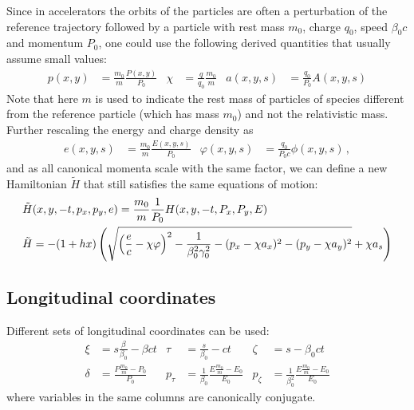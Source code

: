 Since in accelerators the orbits of the 
particles are often a perturbation of the reference trajectory followed by a
particle with rest mass $m_0$, charge $q_0$, speed $\beta_0 c$ and momentum
$P_0$, one could use the following derived quantities that usually assume small
values:
\begin{align}
p(x,y) &=
  \frac{m_0}{m}\frac{P(x,y)}{P_0}   &
\chi &=
  \frac{q}{q_0}\frac{m_0}{m} &
a(x,y,s) &=
  \frac{q_0}{P_0}  A(x,y,s)
\end{align}
Note that here $m$ is used to indicate the rest mass of particles of species
different from the reference particle (which has mass $m_0$) and not the relativistic mass.
Further rescaling the energy and charge density as
\begin{align}
  e(x,y,s) &=
  \frac{m_0}{m}\frac{E(x,y,s)}{P_0}   &
  \varphi(x,y,s) &=
  \frac{q_0}{P_0c}\phi(x,y,s) \,,
\end{align}
and as all canonical momenta scale with the same factor, we can define a new Hamiltonian
$\tilde{H}$ that still satisfies the same equations of motion:
\begin{align}\notag
  &\tilde{H}(x,y,-t, p_x, p_y, e) =
      \frac{m_0}{m}\frac{1}{P_0}H(x,y,-t, P_x, P_y, E) \\
  &\tilde{H}=
    - (1+h x) \left(
      \sqrt{ 
          \left(\frac{e}{c} - \chi\varphi\right)^2
            - \frac{1}{\beta_0^2\gamma_0^2}
           - (p_x - \chi a_x)^2
           - (p_y - \chi a_y)^2}
       + \chi a_s
    \right)
\end{align}

\subsection{Longitudinal coordinates}

Different sets of longitudinal coordinates can be used:
\begin{align}
\xi &= s \frac{\beta}{\beta_0} - \beta c t &
\tau &= \frac{s}{\beta_0} - ct &
\zeta &= s - \beta_0 ct \label{eq:coord1}\\
\delta &=
  \frac{P \frac{m_0}{m} -P_0}{P_0} &
p_\tau &=
  \frac{1}{\beta_0} \frac{E \frac{m_0}{m} -E_0}{E_0} &
p_\zeta &=
  \frac{1}{\beta_0^2}\frac{E \frac{m_0}{m} -E_0}{E_0}
  \label{eq:coord2}
\end{align}
where variables in the same columns are canonically conjugate.

